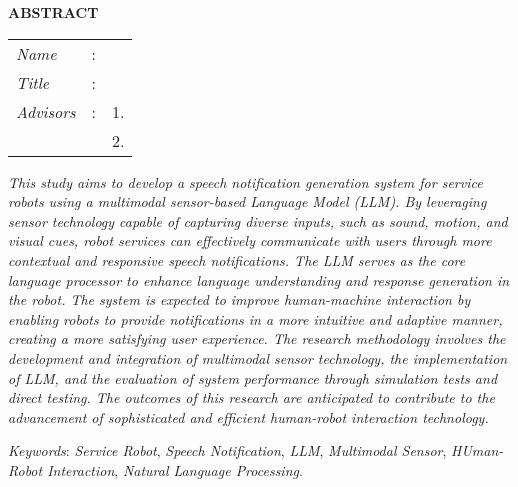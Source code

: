 \begin{center}
  \large\textbf{ABSTRACT}
\end{center}


\vspace{2ex}

\begingroup
\setlength{\tabcolsep}{0pt}

\noindent
\begin{tabularx}{\textwidth}{l >{\centering}m{3em} X}
  \emph{Name}     & : & \name{}         \\

  \emph{Title}    & : & \engtatitle{}   \\

  \emph{Advisors} & : & 1. \advisor{}   \\
                  &   & 2. \coadvisor{} \\
\end{tabularx}
\endgroup

\emph{This study aims to develop a speech notification generation system for service robots using
a multimodal sensor-based Language Model (LLM). By leveraging sensor technology capable of capturing diverse inputs, such as sound, motion, and visual cues, robot services can effectively communicate with users through more contextual and responsive speech notifications.
The LLM serves as the core language processor to enhance language understanding and response generation in the robot. The system is expected to improve human-machine interaction
by enabling robots to provide notifications in a more intuitive and adaptive manner, creating a more satisfying user experience. The research methodology involves the development and
integration of multimodal sensor technology, the implementation of LLM, and the evaluation of system performance through simulation tests and direct testing. The outcomes of this research are anticipated to contribute to the advancement of sophisticated and efficient human-robot interaction technology.}

\emph{Keywords}: \emph{Service Robot}, \emph{Speech Notification}, \emph{LLM}, \emph{Multimodal Sensor}, \emph{HUman-Robot Interaction}, \emph{Natural Language Processing}.

